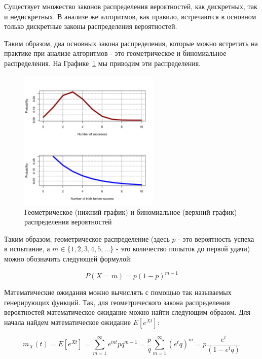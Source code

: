 Существует множество законов распределения вероятностей, как дискретных, 
так и недискретных. В анализе же алгоритмов, как правило, встречаются
в основном только дискретные законы распределения вероятностей.

Таким образом, два основных закона распределения, которые можно встретить на практике
при анализе алгоритмов - это геометрическое и биномиальное распределения.
На Графике~\ref{fig:distributions} мы приводим эти распределения.

\begin{figure}[ht!]
\centering
\includegraphics[width=0.6\textwidth]{graphics/distributions.pdf}
\caption{Геометрическое (нижний график) и биномиальное (верхний график) распределения вероятностей}
\label{fig:distributions}
\end{figure}

Таким образом, геометрическое распределение (здесь $p$ - это 
вероятность успеха в испытание, а $m \in \{1, 2, 3, 4, 5, \ldots\}$ - это 
количество попыток до первой удачи) можно обозначить следующей 
формулой:

$$P(X=m)=p(1-p)^{m-1}$$

Математические ожидания можно вычислять с помощью так называемых 
генерирующих функций. Так, для геометрического закона распределения 
вероятностей математическое ожидание можно найти следующим образом.
Для начала найдем математическое ожидание $E[e^{Xt}]$:


$$m_X(t) = E[e^{Xt}] = \sum_{m=1}^{\infty} e^{mt}pq^{m-1} = 
\frac{p}{q}\sum_{m=1}^{\infty} (e^{t}q)^{m} = p\frac{e^t}{(1-e^tq)}$$

